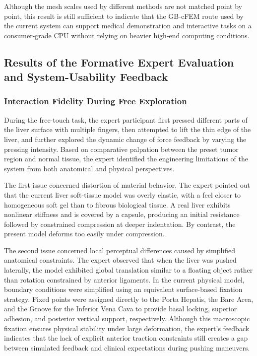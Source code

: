 \documentclass{ieeeaccess}
\begin{document}
Although the mesh scales used by different methods are not matched point by point, this result is still sufficient to indicate that the GB-cFEM route used by the current system can support medical demonstration and interactive tasks on a consumer-grade CPU without relying on heavier high-end computing conditions.

\subsection{Results of the Formative Expert Evaluation and System-Usability Feedback}
\subsubsection{Interaction Fidelity During Free Exploration}
During the free-touch task, the expert participant first pressed different parts of the liver surface with multiple fingers, then attempted to lift the thin edge of the liver, and further explored the dynamic change of force feedback by varying the pressing intensity. Based on comparative palpation between the preset tumor region and normal tissue, the expert identified the engineering limitations of the system from both anatomical and physical perspectives.

The first issue concerned distortion of material behavior. The expert pointed out that the current liver soft-tissue model was overly elastic, with a feel closer to homogeneous soft gel than to fibrous biological tissue. A real liver exhibits nonlinear stiffness and is covered by a capsule, producing an initial resistance followed by constrained compression at deeper indentation. By contrast, the present model deforms too easily under compression.

The second issue concerned local perceptual differences caused by simplified anatomical constraints. The expert observed that when the liver was pushed laterally, the model exhibited global translation similar to a floating object rather than rotation constrained by anterior ligaments. In the current physical model, boundary conditions were simplified using an equivalent surface-based fixation strategy. Fixed points were assigned directly to the Porta Hepatis, the Bare Area, and the Groove for the Inferior Vena Cava to provide basal locking, superior adhesion, and posterior vertical support, respectively. Although this macroscopic fixation ensures physical stability under large deformation, the expert's feedback indicates that the lack of explicit anterior traction constraints still creates a gap between simulated feedback and clinical expectations during pushing maneuvers.
\end{document}
